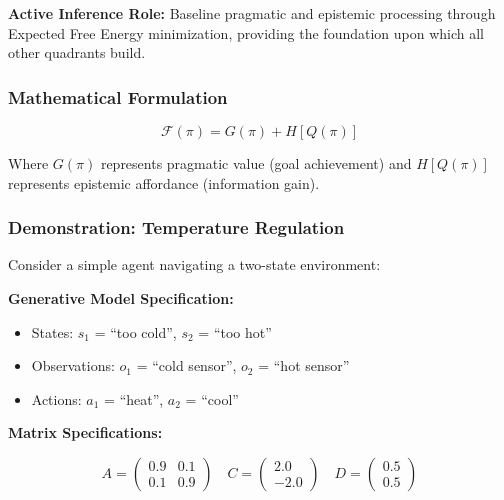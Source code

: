 \documentclass[
]{article}
\providecommand{\tightlist}{%
  \setlength{\itemsep}{0pt}\setlength{\parskip}{0pt}}
\begin{document}
\textbf{Active Inference Role:} Baseline pragmatic and epistemic
processing through Expected Free Energy minimization, providing the
foundation upon which all other quadrants build.

\subsubsection{Mathematical Formulation}\label{mathematical-formulation}

\begin{equation}
\mathcal{F}(\pi) = G(\pi) + H[Q(\pi)]
\label{eq:efe_simple}
\end{equation}

Where \(G(\pi)\) represents pragmatic value (goal achievement) and
\(H[Q(\pi)]\) represents epistemic affordance (information gain).

\subsubsection{Demonstration: Temperature
Regulation}\label{demonstration-temperature-regulation}

Consider a simple agent navigating a two-state environment:

\textbf{Generative Model Specification:}

\begin{itemize}
\tightlist
\item
  States: \(s_1\) = ``too cold'', \(s_2\) = ``too hot''
\item
  Observations: \(o_1\) = ``cold sensor'', \(o_2\) = ``hot sensor''
\item
  Actions: \(a_1\) = ``heat'', \(a_2\) = ``cool''
\end{itemize}

\textbf{Matrix Specifications:}

\begin{equation}
A = \begin{pmatrix} 0.9 & 0.1 \\ 0.1 & 0.9 \end{pmatrix} \quad C = \begin{pmatrix} 2.0 \\ -2.0 \end{pmatrix} \quad D = \begin{pmatrix} 0.5 \\ 0.5 \end{pmatrix}
\label{eq:q1_matrices}
\end{equation}
\end{document}
